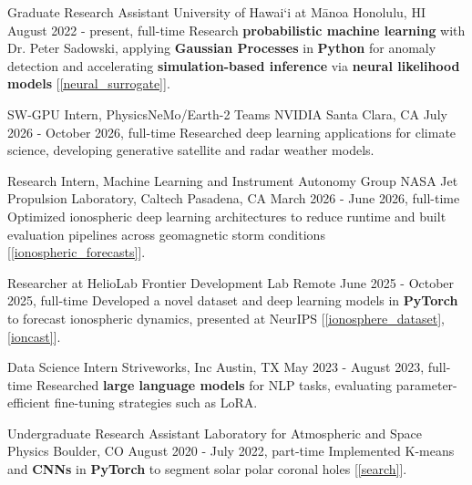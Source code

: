 
\vspace{-0.5mm}

\begin{cventries}

\cventry
{Graduate Research Assistant}
{University of Hawai`i at Mānoa}
{Honolulu, HI}
{August 2022 - present, full-time}
{
    Research \textbf{probabilistic machine learning} with Dr. Peter Sadowski, applying \textbf{Gaussian Processes} in \textbf{Python} for anomaly detection and accelerating \textbf{simulation-based inference} via \textbf{neural likelihood models} [\ref{neural_surrogate}].
}

\vspace{0mm}

\cventry
{SW-GPU Intern, PhysicsNeMo/Earth-2 Teams}
{NVIDIA}
{Santa Clara, CA}
{July 2026 - October 2026, full-time}
{
    Researched deep learning applications for climate science, developing generative satellite and radar weather models.
}

\vspace{0mm}

\cventry
{Research Intern, Machine Learning and Instrument Autonomy Group}
{NASA Jet Propulsion Laboratory, Caltech}
{Pasadena, CA}
{March 2026 - June 2026, full-time}
{
    Optimized ionospheric deep learning architectures to reduce runtime and built evaluation pipelines across geomagnetic storm conditions [\ref{ionospheric_forecasts}].
}

\vspace{0mm}

\cventry
{Researcher at HelioLab}
{Frontier Development Lab}
{Remote}
{June 2025 - October 2025, full-time}
{
    Developed a novel dataset and deep learning models in \textbf{PyTorch} to forecast ionospheric dynamics, presented at NeurIPS [\ref{ionosphere_dataset}, \ref{ioncast}].
}

\vspace{0mm}

\cventry
{Data Science Intern}
{Striveworks, Inc}
{Austin, TX}
{May 2023 - August 2023, full-time}
{
    Researched \textbf{large language models} for NLP tasks, evaluating parameter-efficient fine-tuning strategies such as LoRA.
}

\vspace{0mm}

\cventry
{Undergraduate Research Assistant}
{Laboratory for Atmospheric and Space Physics}
{Boulder, CO}
{August 2020 - July 2022, part-time}
{
    Implemented K-means and \textbf{CNNs} in \textbf{PyTorch} to segment solar polar coronal holes [\ref{search}].
}


\end{cventries}
